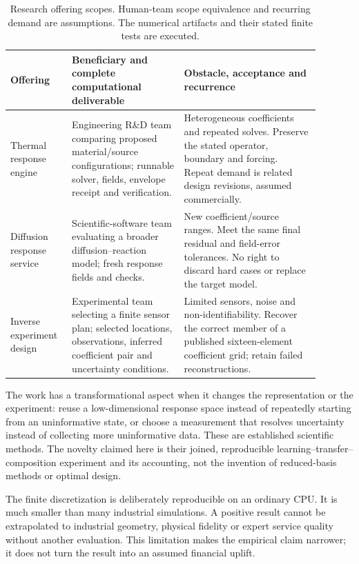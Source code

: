 \documentclass[11pt,letterpaper]{article}
\begin{document}
\begin{table}[htbp]
\centering\small
\begin{tabular}{p{0.16\linewidth}p{0.33\linewidth}p{0.40\linewidth}}
\toprule
Offering & Beneficiary and complete computational deliverable & Obstacle, acceptance and recurrence \\
\midrule
Thermal response engine & Engineering R\&D team comparing proposed material/source configurations; runnable solver, fields, envelope receipt and verification. & Heterogeneous coefficients and repeated solves. Preserve the stated operator, boundary and forcing. Repeat demand is related design revisions, assumed commercially. \\
Diffusion response service & Scientific-software team evaluating a broader diffusion--reaction model; fresh response fields and checks. & New coefficient/source ranges. Meet the same final residual and field-error tolerances. No right to discard hard cases or replace the target model. \\
Inverse experiment design & Experimental team selecting a finite sensor plan; selected locations, observations, inferred coefficient pair and uncertainty conditions. & Limited sensors, noise and non-identifiability. Recover the correct member of a published sixteen-element coefficient grid; retain failed reconstructions. \\
\bottomrule
\end{tabular}
\caption{Research offering scopes. Human-team scope equivalence and recurring demand are assumptions. The numerical artifacts and their stated finite tests are executed.}
\label{tab:offerings}
\end{table}

The work has a transformational aspect when it changes the representation or the experiment: reuse a low-dimensional response space instead of repeatedly starting from an uninformative state, or choose a measurement that resolves uncertainty instead of collecting more uninformative data. These are established scientific methods. The novelty claimed here is their joined, reproducible learning--transfer--composition experiment and its accounting, not the invention of reduced-basis methods or optimal design.

The finite discretization is deliberately reproducible on an ordinary CPU. It is much smaller than many industrial simulations. A positive result cannot be extrapolated to industrial geometry, physical fidelity or expert service quality without another evaluation. This limitation makes the empirical claim narrower; it does not turn the result into an assumed financial uplift.
\end{document}
